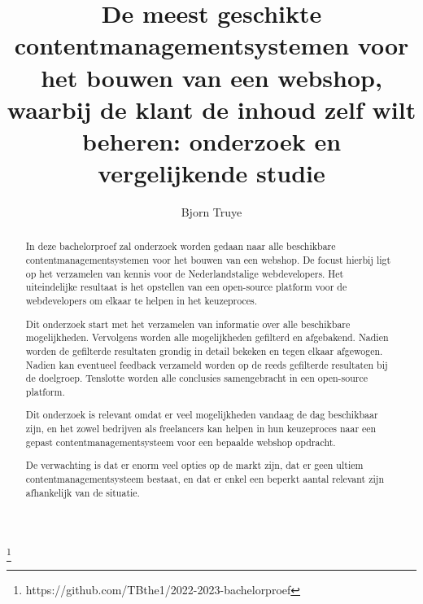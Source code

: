 \documentclass{hogent-article}
\title{De meest geschikte contentmanagementsystemen voor het bouwen van een webshop, waarbij de klant de inhoud zelf wilt beheren: onderzoek en vergelijkende studie}
\author{Bjorn Truye}
\begin{document}
\begin{abstract}
 In deze bachelorproef zal onderzoek worden gedaan naar alle beschikbare contentmanagementsystemen voor het bouwen van een webshop. De focust hierbij ligt op het verzamelen van kennis voor de Nederlandstalige webdevelopers. Het uiteindelijke resultaat is het opstellen van een open-source platform voor de webdevelopers om elkaar te helpen in het keuzeproces.
  
 Dit onderzoek start met het verzamelen van informatie over alle beschikbare mogelijkheden. Vervolgens worden alle mogelijkheden gefilterd en afgebakend. Nadien worden de gefilterde resultaten grondig in detail bekeken en tegen elkaar afgewogen. Nadien kan eventueel feedback verzameld worden op de reeds gefilterde resultaten bij de doelgroep. Tenslotte worden alle conclusies samengebracht in een open-source platform.   
 
 Dit onderzoek is relevant omdat er veel mogelijkheden vandaag de dag beschikbaar zijn, en het zowel bedrijven als freelancers kan helpen in hun keuzeproces naar een gepast contentmanagementsysteem voor een bepaalde webshop opdracht.
 
 De verwachting is dat er enorm veel opties op de markt zijn, dat er geen ultiem contentmanagementsysteem bestaat, en dat er enkel een beperkt aantal relevant zijn afhankelijk van de situatie.
   
\end{abstract}

\tableofcontents



\printbibliography[heading=bibintoc]

\footnote{https://github.com/TBthe1/2022-2023-bachelorproef}
\end{document}
